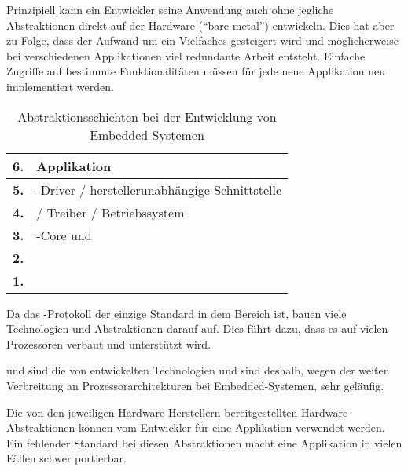     Prinzipiell kann ein Entwickler seine Anwendung auch ohne jegliche Abstraktionen direkt auf der Hardware
    (``bare metal'') entwickeln. Dies hat aber zu Folge, dass der Aufwand um ein Vielfaches gesteigert wird und
    möglicherweise bei verschiedenen Applikationen viel redundante Arbeit entsteht. Einfache Zugriffe auf
    bestimmte Funktionalitäten müssen für jede neue Applikation neu implementiert werden.

    \begin{table}[h]
        \centering
        \caption{Abstraktionsschichten bei der Entwicklung von Embedded-Systemen}
        \label{tab:hwabstractionlayer}
        \begin{tabular}{| c | C{7cm} |}
        \hline
        \textbf{6.} & Applikation                                           \\ \hline
        \textbf{5.} & -Driver / herstellerunabhängige Schnittstelle   \\ \hline
        \textbf{4.} &  / Treiber / Betriebssystem                        \\ \hline
        \textbf{3.} & -Core und                               \\ \hline
        \textbf{2.} &                                                    \\ \hline
        \textbf{1.} &                                                   \\ \hline
        \end{tabular}
    \end{table}

    Da das -Protokoll der einzige Standard in dem Bereich ist, bauen viele Technologien und Abstraktionen darauf
    auf. Dies führt dazu, dass es auf vielen Prozessoren verbaut und unterstützt wird.

     und  sind die von  entwickelten Technologien und sind deshalb, wegen der weiten Verbreitung an 
    Prozessorarchitekturen bei Embedded-Systemen, sehr geläufig.

    Die von den jeweiligen Hardware\hyp{}Herstellern bereitgestellten Hardware\hyp{}Abstraktionen können vom Entwickler für eine
    Applikation verwendet werden. Ein fehlender Standard bei diesen Abstraktionen macht eine Applikation in vielen
    Fällen schwer portierbar.

